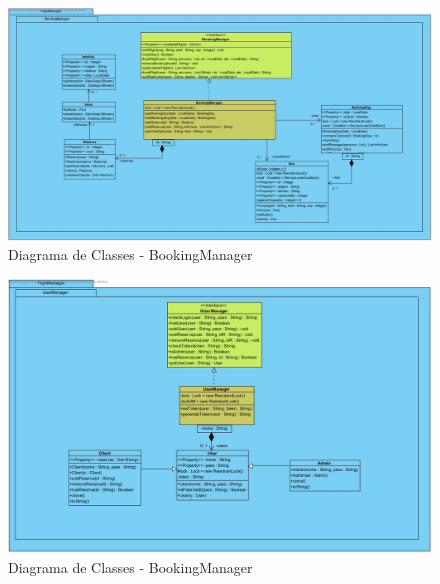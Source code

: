 \documentclass[a4paper,11pt]{scrreprt}
\begin{document}
\begin{landscape}
    \begin{figure}[!ht]
        \centering
        \includegraphics[width=0.9\linewidth]{diagramas/BookingManagerClassDiagram.jpg}
        \caption{Diagrama de Classes - BookingManager} \label{img:booking_manager}
    \end{figure}
\end{landscape}

\begin{landscape}
    \begin{figure}[!ht]
        \centering
        \includegraphics[width=0.75\linewidth]{diagramas/UserManagerClassDiagram.jpg}
        \caption{Diagrama de Classes - BookingManager} \label{img:user_manager}
    \end{figure}
\end{landscape}
\end{document}
